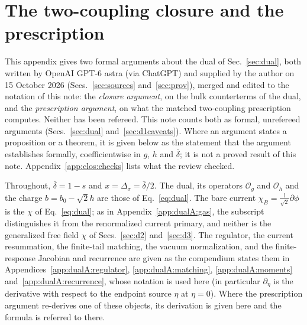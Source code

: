 \documentclass[11pt,a4paper]{article}
\numberwithin{equation}{section}
\newcommand{\Ds}{\Delta_\sigma}
\newcommand{\db}{\bar\delta}
\newcommand{\Og}{\mathcal O_g}
\newcommand{\Oh}{\mathcal O_h}
\begin{document}
\section{The two-coupling closure and the prescription}\label{app:clos}
This appendix gives two formal arguments about the dual of Sec.~\ref{sec:dual}, both written by OpenAI GPT-6 astra
(via ChatGPT) and supplied by the author on 15 October 2026 (Secs.~\ref{sec:sources} and~\ref{sec:prov}), merged and edited to the
notation of this note: the \emph{closure argument}, on the bulk counterterms of the dual, and the \emph{prescription
argument}, on what the matched two-coupling prescription computes. Neither has been refereed. This note counts both as
formal, unrefereed arguments (Secs.~\ref{sec:dual} and~\ref{sec:d1caveats}). Where an argument states a proposition
or a theorem, it is given below as the statement that the argument establishes formally, coefficientwise in $g$, $h$
and $\db$; it is not a proved result of this note. Appendix~\ref{app:clos:checks} lists what the review checked.

Throughout, $\db=1-s$ and $x=\Ds=\db/2$. The dual, its operators $\Og$ and $\Oh$ and the charge $b=b_0-\sqrt2h$
are those of Eq.~\eqref{eq:dual}. The bare current $\chi_B=\frac{\mathrm i}{\sqrt2}\partial\phi$ is the $\chi$ of
Eq.~\eqref{eq:dual}; as in Appendix~\ref{app:dualA:gas}, the subscript distinguishes it from the renormalized current
primary, and neither is the generalized free field $\chi$ of Secs.~\ref{sec:d2} and~\ref{sec:d3}. The regulator, the
current resummation, the finite-tail matching, the vacuum normalization, and the finite-response Jacobian and
recurrence are given as the compendium states them in Appendices~\ref{app:dualA:regulator}, \ref{app:dualA:matching},
\ref{app:dualA:moments} and~\ref{app:dualA:recurrence}, whose notation is used here (in particular $\partial_\eta$ is
the derivative with respect to the endpoint source $\eta$ at $\eta=0$). Where the prescription argument re-derives
one of these objects, its derivation is given here and the formula is referred to there.
\end{document}
